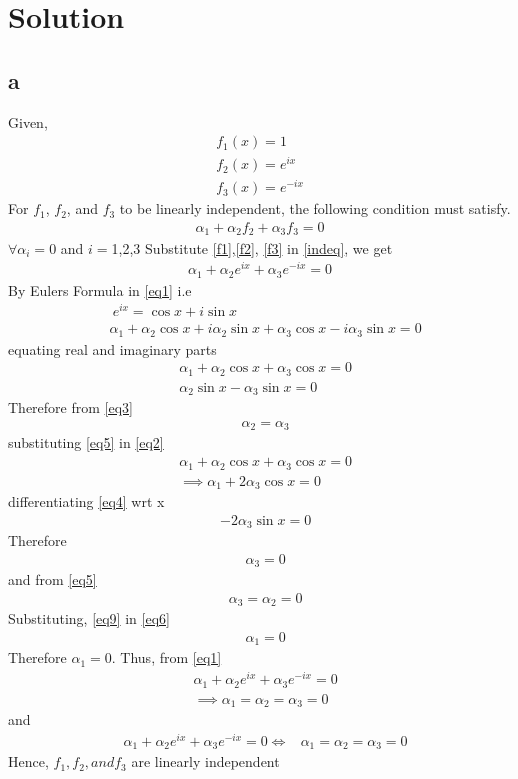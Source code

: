 \documentclass[journal,12pt,twocolumn]{IEEEtran}
\begin{document}
\section{Solution}
\subsection{a}
Given,
\begin{align}
    f_1(x)=1\label{f1}\\
    f_2(x)=e^{ix}\label{f2}\\
    f_3(x)=e^{-ix}\label{f3}
\end{align}
For $f_1$, $f_2$, and $f_3$ to be linearly independent, the following condition must satisfy.
\begin{align}
    \alpha_1+\alpha_2 f_2+\alpha_3 f_3=0\label{indeq}
\end{align}
$\forall \alpha_i=0$ and $i=$1,2,3
Substitute \eqref{f1},\eqref{f2}, \eqref{f3} in \eqref{indeq}, we get
\begin{align}
    \alpha_1+\alpha_2e^{ix}+\alpha_3e^{-ix}=0\label{eq1}
\end{align}
By Eulers Formula in \eqref{eq1} i.e
\begin{align} 
&  \ e^{ix}=\cos{x}+i\sin{x} \\
&\alpha_1+\alpha_2\cos{x}+i \alpha_2\sin{x}+\alpha_3\cos{x}-i \alpha_3\sin{x}=0
\end{align}
equating real and imaginary parts
\begin{align}
&\alpha_1+\alpha_2\cos{x}+\alpha_3\cos{x}=0\label{eq2}\\
&\alpha_2\sin{x} -\alpha_3\sin{x}=0\label{eq3}
\end{align}
Therefore from \eqref{eq3}
\begin{align}
&\alpha_2=\alpha_3\label{eq5}
\end{align}
substituting \eqref{eq5} in \eqref{eq2}
\begin{align}
&\alpha_1+\alpha_2\cos{x}+\alpha_3\cos{x}=0\label{eq6}\\
&\implies \alpha_1+2\alpha_3\cos{x}=0\label{eq4}
\end{align}
differentiating \eqref{eq4} wrt x
\begin{align}
&-2\alpha_3\sin{x}=0\end{align}
Therefore
\begin{align}
&\alpha_3=0\end{align}
and from \eqref{eq5} 
\begin{align}
    &\alpha_3=\alpha_2=0\label{eq9}
\end{align}
Substituting, \eqref{eq9} in \eqref{eq6} 
\begin{align}
&\alpha_1=0    
\end{align}
Therefore $\alpha_1=0$.
 Thus, from \eqref{eq1}
 \begin{align}
&\alpha_1+\alpha_2 e^{ix}+\alpha_3 e^{-ix}=0 \\
 &\implies \alpha_1=\alpha_2=\alpha_3=0    
 \end{align} and
 \begin{align}
& \alpha_1+\alpha_2 e^{ix}+\alpha_3 e^{-ix}=0 \iff &\alpha_1=\alpha_2=\alpha_3=0    
 \end{align}
 Hence, $f_1, f_2, and f_3$ are linearly independent
\end{document}
